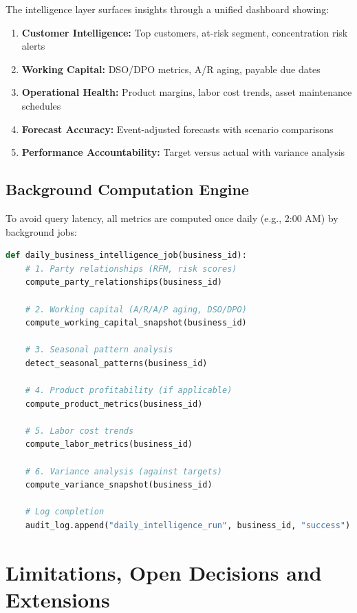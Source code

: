 \documentclass[10pt,a4paper]{article}
\begin{document}
The intelligence layer surfaces insights through a unified dashboard showing:

\begin{enumerate}[label=\textbf{\arabic*.}]
  \item \textbf{Customer Intelligence:} Top customers, at-risk segment, concentration risk alerts
  \item \textbf{Working Capital:} DSO/DPO metrics, A/R aging, payable due dates
  \item \textbf{Operational Health:} Product margins, labor cost trends, asset maintenance schedules
  \item \textbf{Forecast Accuracy:} Event-adjusted forecasts with scenario comparisons
  \item \textbf{Performance Accountability:} Target versus actual with variance analysis
\end{enumerate}

\subsection{Background Computation Engine}

To avoid query latency, all metrics are computed once daily (e.g., 2:00 AM) by background jobs:

\begin{lstlisting}[language=Python,caption={Daily metrics computation}]
def daily_business_intelligence_job(business_id):
    # 1. Party relationships (RFM, risk scores)
    compute_party_relationships(business_id)
    
    # 2. Working capital (A/R/A/P aging, DSO/DPO)
    compute_working_capital_snapshot(business_id)
    
    # 3. Seasonal pattern analysis
    detect_seasonal_patterns(business_id)
    
    # 4. Product profitability (if applicable)
    compute_product_metrics(business_id)
    
    # 5. Labor cost trends
    compute_labor_metrics(business_id)
    
    # 6. Variance analysis (against targets)
    compute_variance_snapshot(business_id)
    
    # Log completion
    audit_log.append("daily_intelligence_run", business_id, "success")
\end{lstlisting}

\section{Limitations, Open Decisions and Extensions}
\end{document}
